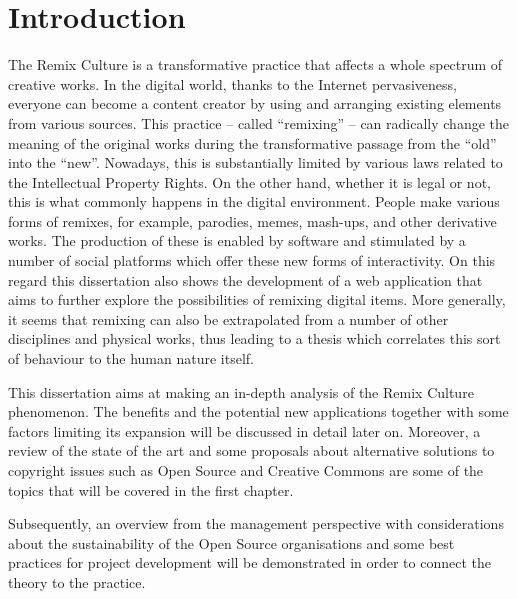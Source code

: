 \chapter*{Introduction}
\label{ch:introduction}


The Remix Culture is a transformative practice that affects a whole spectrum of creative works. In the digital world, thanks to the Internet pervasiveness, everyone can become a content creator by using and arranging existing elements from various sources. This practice – called “remixing” – can radically change the meaning of the original works during the transformative passage from the “old” into the “new”. Nowadays, this is substantially limited by various laws related to the Intellectual Property Rights. On the other hand, whether it is legal or not, this is what commonly happens in the digital environment. People make various forms of remixes, for example, parodies, memes, mash-ups, and other derivative works. The production of these is enabled by software and stimulated by a number of social platforms which offer these new forms of interactivity. On this regard this dissertation also shows the development of a web application that aims to further explore the possibilities of remixing digital items. More generally, it seems that remixing can also be extrapolated from a number of other disciplines and physical works, thus leading to a thesis which correlates this sort of behaviour to the human nature itself.

This dissertation aims at making an in-depth analysis of the Remix Culture phenomenon. The benefits and the potential new applications together with some factors limiting its expansion will be discussed in detail later on. Moreover, a review of the state of the art and some proposals about alternative solutions to copyright issues such as Open Source and Creative Commons are some of the topics that will be covered in the first chapter.

Subsequently, an overview from the management perspective with considerations about the sustainability of the Open Source organisations and some best practices for project development will be demonstrated in order to connect the theory to the practice.

